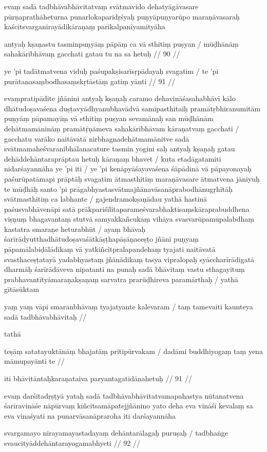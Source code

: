 evaṃ sadā tadbhāvabhāvitatvaṃ svātmavido dehatyāgāvasare pūrṇaprathāheturna punarlokaparidṛśyaḥ puṇyāpuṇyarūpo maraṇāvasaraḥ kaścitsvarganirayādikāraṇaṃ parikalpanīyamityāha

antyaḥ kṣaṇastu tasminpuṇyāṃ pāpāṃ ca vā sthitiṃ puṣyan  /
mūḍhānāṃ sahakārībhāvaṃ gacchati gatau tu na sa hetuḥ  // 90  //

ye 'pi tadātmatvena viduḥ paśupakṣisarīsṛpādayaḥ svagatim  /
te 'pi purātanasaṃbodhasaṃskṛtāstāṃ gatiṃ yānti  // 91  //

evaṃpratipādite jñānini antyaḥ kṣaṇaḥ caramo dehavināśasahabhāvī kālo dhātudoṣavaśena duṣṭavyādhyanubhavādvā samīpasthitaiḥ pramātṛbhiranumitām puṇyāṃ pāpamayīṃ vā sthitiṃ puṣyan sevamānaḥ san mūḍhānām dehātmamānināṃ pramātṝṇāmeva sahakārībhāvam kāraṇatvaṃ gacchati  / gacchatu varāko naitāvatā nirbhagnadehātmamānitve sadā svātmamaheśvaranibhālanacature tasmin yogini saḥ antyaḥ kṣaṇaḥ gatau dehāddehāntaraprāptau hetuḥ kāraṇaṃ bhavet  / kuta etadāgatamiti nidarśayannāha ye 'pi iti  / ye 'pi kenāpyāśayavaśena śāpādinā vā pāpayonayaḥ paśurūpatāmapi prāptāḥ svagatim ātmasthitiṃ maraṇāvasare ātmatvena jānīyuḥ te mūḍhāḥ santo 'pi prāgabhyastasvātmajñānavāsanāprabodhānugṛhītāḥ svātmasthitiṃ ca labhante  / gajendramokṣaṇādau yathā hastinā paśusvabhāvenāpi satā prākpariśīlitaparameśvarabhaktisaṃskāraprabuddhena viṣṇuṃ bhagavantaṃ stutvā samyakkañcukaṃ vihāya svasvarūpamupalabdhaṃ kastatra smaraṇe heturabhūt  / ayaṃ bhāvaḥ śarīrādyutthadhātudoṣavaśātkāṣṭhapāṣāṇaceṣṭo jñānī puṇyaṃ pāpamālabiḍālādikaṃ vā yatkiñcitpralapandehaṃ tyajati naitāvatā svasthaceṣṭatayā yadabhyastaṃ jñānādikaṃ tasya vipralopaḥ syāccharīrādigatā dharmāḥ śarīrādāveva nipatanti na punaḥ sadā bhāvitaṃ vastu sthagayituṃ prabhavantītyāmaraṇakṣaṇaṃ sarvatra prarūḍhireva paramārthaḥ  / yathā gītāsūktam

yaṃ yaṃ vāpi smaranbhāvaṃ tyajatyante kalevaram  /
taṃ tamevaiti kaunteya sadā tadbhāvabhāvitaḥ  //

tathā

teṣāṃ satatayuktānāṃ bhajatāṃ prītipūrvakam  /
dadāmi buddhiyogaṃ taṃ yena māmupayānti te  //

iti bhāvitāntaḥkaraṇataiva paryantagatidānahetuḥ  // 91  //

evaṃ darśitadṛṣṭyā yataḥ sadā tadbhāvabhāvitatvamapahastya nūtanatvena śarīravināśe nāpūrvaṃ kiñcitsamāpatejjñānino yato deha eva vināśī kevalaṃ sa eva vinaśyati na punarvāsanāpraroha iti darśayannāha

svargamayo nirayamayastadayaṃ dehāntarālagaḥ puruṣaḥ  /
tadbhaṅge svaucityāddehāntarayogamabhyeti  // 92  //

